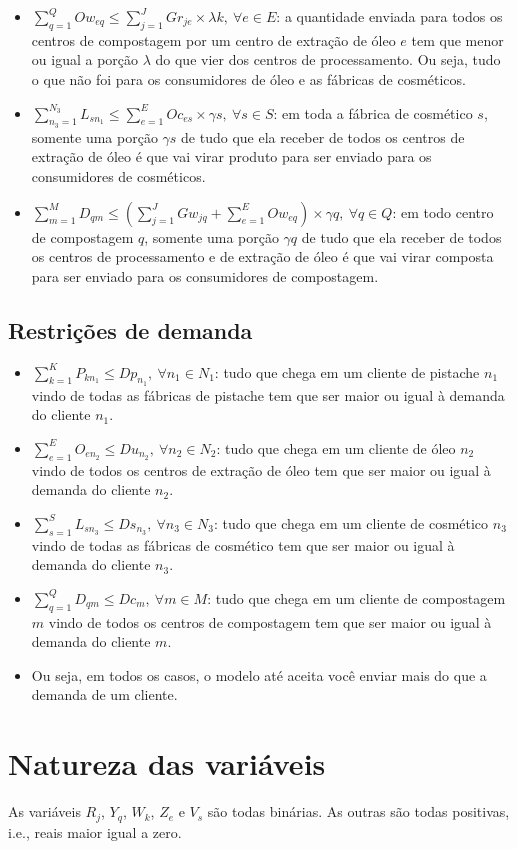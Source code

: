 \documentclass[]{article}
\begin{document}
\begin{itemize}
				\item $\sum\limits_{q=1}^{Q} Ow_{eq} \le \sum\limits_{j=1}^J Gr_{je} \times \lambda k,~\forall e \in E$: a quantidade enviada para todos os centros de compostagem por um centro de extração de óleo $e$ tem que menor ou igual a porção $\lambda$ do que vier dos centros de processamento. Ou seja, tudo o que não foi para os consumidores de óleo e as fábricas de cosméticos.
				\item $\sum\limits_{n_3=1}^{N_3} L_{sn_1} \le \sum\limits_{e=1}^E Oc_{es} \times \gamma s,~\forall s \in S$: em toda a fábrica de cosmético $s$, somente uma porção $\gamma s$ de tudo que ela receber de todos os centros de extração de óleo é que vai virar produto para ser enviado para os consumidores de cosméticos.
				\item $\sum\limits_{m=1}^M D_{qm} \le \left(\sum\limits_{j=1}^J Gw_{jq} + \sum\limits_{e=1}^E Ow_{eq} \right) \times \gamma q,~\forall q \in Q$: em todo centro de compostagem $q$, somente uma porção $\gamma q$ de tudo que ela receber de todos os centros de processamento e de extração de óleo é que vai virar composta para ser enviado para os consumidores de compostagem.
			\end{itemize}
		
		\subsection{Restrições de demanda}
			
			\begin{itemize}
				\item $\sum\limits_{k=1}^K P_{kn_1} \le Dp_{n_1},~\forall n_1 \in N_1$: tudo que chega em um cliente de pistache $n_1$ vindo de todas as fábricas de pistache tem que ser maior ou igual à demanda do cliente $n_1$.
				\item $\sum\limits_{e=1}^E O_{en_2} \le Du_{n_2},~\forall n_2 \in N_2$: tudo que chega em um cliente de óleo $n_2$ vindo de todos os centros de extração de óleo tem que ser maior ou igual à demanda do cliente $n_2$.
				\item $\sum\limits_{s=1}^S L_{sn_3} \le Ds_{n_3},~\forall n_3 \in N_3$: tudo que chega em um cliente de cosmético $n_3$ vindo de todas as fábricas de cosmético tem que ser maior ou igual à demanda do cliente $n_3$.
				\item $\sum\limits_{q=1}^Q D_{qm} \le Dc_{m},~\forall m \in M$: tudo que chega em um cliente de compostagem $m$ vindo de todos os centros de compostagem tem que ser maior ou igual à demanda do cliente $m$.
				\item Ou seja, em todos os casos, o modelo até aceita você enviar mais do que a demanda de um cliente.
			\end{itemize}
		
	\section{Natureza das variáveis}
	
		As variáveis $R_j$, $Y_q$, $W_k$, $Z_e$ e $V_s$ são todas binárias. As outras são todas positivas, i.e., reais maior igual a zero.
\end{document}
